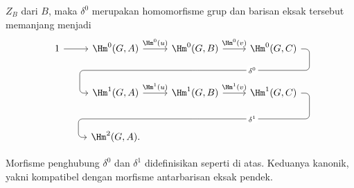 \begin{teorema}
\begin{enumerate}[(i)]
		$Z_B$ dari $B$, maka $\delta^0$ merupakan homomorfisme grup dan barisan
		eksak tersebut memanjang menjadi
		\begin{equation*}\begin{tikzcd}[row sep=large]
			1 \arrow[r] & \Hm^0(G, A) \arrow[r, "{\Hm^0(u)}"] & \Hm^0(G, B) \arrow[r, "{\Hm^0(v)}"] \arrow[phantom, d, ""{coordinate, name=A}] & \Hm^0(G, C) \arrow[dll, rounded corners, "{\delta^0}" description, to path={
				-- ([xshift=2ex]\tikztostart.east)
				|- (A) [near end]\tikztonodes
				-| ([xshift=-2ex]\tikztotarget.west)
				-- (\tikztotarget)}] \\
			& \Hm^1(G, A) \arrow[r, "{\Hm^1(u)}"] & \Hm^1(G, B) \arrow[r, "{\Hm^1(v)}"] \arrow[phantom, d, ""{coordinate, name=B}] & \Hm^1(G, C) \arrow[dll, rounded corners, "{\delta^1}" description, to path={
				-- ([xshift=2ex]\tikztostart.east)
				|- (B) [near end]\tikztonodes
				-| ([xshift=-2ex]\tikztotarget.west)
				-- (\tikztotarget)}] \\
			& \Hm^2(G, A) . & {} & {}
		\end{tikzcd}\end{equation*}
	\end{enumerate}

	Morfisme penghubung $\delta^0$ dan $\delta^1$ didefinisikan seperti di
	atas. Keduanya kanonik, yakni kompatibel dengan morfisme antarbarisan
	eksak pendek.
\end{teorema}
